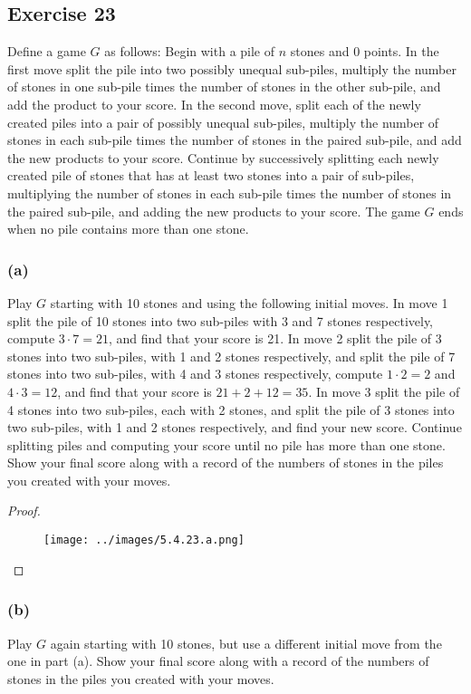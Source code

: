 \documentclass[14pt]{extarticle}
\begin{document}
\subsection{Exercise 23}
Define a game $G$ as follows: Begin with a pile of $n$ stones and 0 points. In the first move split the pile into
two possibly unequal sub-piles, multiply the number of stones in one sub-pile times the number of stones in the
other sub-pile, and add the product to your score. In the second move, split each of the newly created piles into a
pair of possibly unequal sub-piles, multiply the number of stones in each sub-pile times the number of stones in the
paired sub-pile, and add the new products to your score. Continue by successively splitting each newly created pile
of stones that has at least two stones into a pair of sub-piles, multiplying the number of stones in each sub-pile
times the number of stones in the paired sub-pile, and adding the new products to your score. The game $G$ ends
when no pile contains more than one stone.

\subsubsection{(a)}
Play $G$ starting with 10 stones and using the following initial moves. In move 1 split the pile of 10 stones into two sub-piles with 3 and 7 stones respectively, compute $3 \cdot 7 = 21$, and find that your score is 21. In move 2 split the pile of 3 stones into two sub-piles, with 1 and 2 stones respectively, and split the pile of 7 stones into two sub-piles, with 4 and 3 stones respectively, compute $1 \cdot 2 = 2$ and $4 \cdot 3 = 12$, and find that your score is $21 + 2 + 12 = 35$. In move 3 split the pile of 4 stones into two sub-piles, each with 2 stones, and split the pile of 3 stones into two sub-piles, with 1 and 2 stones respectively, and find your new score. Continue splitting piles and computing your score until no pile has more than one stone. Show your final score along with a record of the numbers of stones in the piles you created with your moves.

\begin{proof}
    \begin{figure}[ht!]
        \centering
        \texttt{[image: ../images/5.4.23.a.png]}
    \end{figure}
\end{proof}

\subsubsection{(b)}
Play $G$ again starting with 10 stones, but use a different initial move from the one in part (a). Show your final score along with a record of the numbers of stones in the piles you created with your moves.
\end{document}
